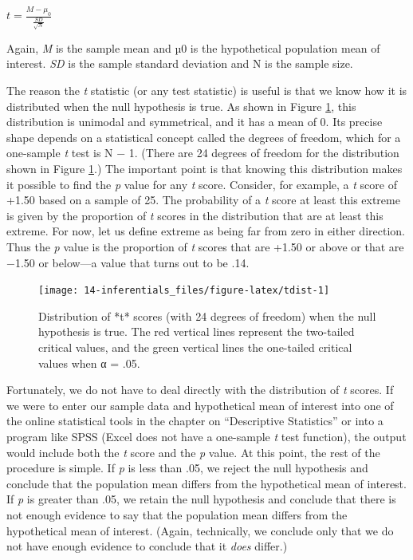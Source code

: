 \documentclass[
]{krantz}
\begin{document}
\(t=\frac{M-\mu_0}{\frac{SD}{\sqrt{N}}}\)

Again, \emph{M} is the sample mean and µ0 is the hypothetical population mean of interest. \emph{SD} is the sample standard deviation and N is the sample size.

The reason the \emph{t} statistic (or any test statistic) is useful is that we know how it is distributed when the null hypothesis is true. As shown in Figure \ref{fig:tdist}, this distribution is unimodal and symmetrical, and it has a mean of 0. Its precise shape depends on a statistical concept called the degrees of freedom, which for a one-sample \emph{t} test is N − 1. (There are 24 degrees of freedom for the distribution shown in Figure \ref{fig:tdist}.) The important point is that knowing this distribution makes it possible to find the \emph{p} value for any \emph{t} score. Consider, for example, a \emph{t} score of +1.50 based on a sample of 25. The probability of a \emph{t} score at least this extreme is given by the proportion of \emph{t} scores in the distribution that are at least this extreme. For now, let us define extreme as being far from zero in either direction. Thus the \emph{p} value is the proportion of \emph{t} scores that are +1.50 or above or that are −1.50 or below---a value that turns out to be .14.

\begin{figure}

{\centering \texttt{[image: 14-inferentials\_files/figure-latex/tdist-1]} 

}

\caption{Distribution of *t* scores (with 24 degrees of freedom) when the null hypothesis is true. The red vertical lines represent the two-tailed critical values, and the green vertical lines the one-tailed critical values when α = .05.}\label{fig:tdist}
\end{figure}

Fortunately, we do not have to deal directly with the distribution of \emph{t} scores. If we were to enter our sample data and hypothetical mean of interest into one of the online statistical tools in the chapter on ``Descriptive Statistics'' or into a program like SPSS (Excel does not have a one-sample \emph{t} test function), the output would include both the \emph{t} score and the \emph{p} value. At this point, the rest of the procedure is simple. If \emph{p} is less than .05, we reject the null hypothesis and conclude that the population mean differs from the hypothetical mean of interest. If \emph{p} is greater than .05, we retain the null hypothesis and conclude that there is not enough evidence to say that the population mean differs from the hypothetical mean of interest. (Again, technically, we conclude only that we do not have enough evidence to conclude that it \emph{does} differ.)
\end{document}

